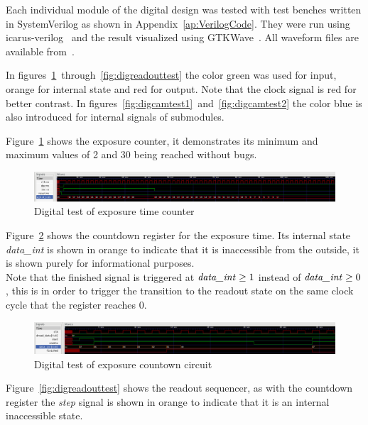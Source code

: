Each individual module of the digital design was tested with test benches written in SystemVerilog as shown in Appendix~\ref{ap:VerilogCode}.
They were run using icarus-verilog~\cite{icarusVL} and the result visualized using GTKWave~\cite{gtkwave}.
All waveform files are available from~\cite{githubProject}.

In figures~\ref{fig:digexptest}~through~\ref{fig:digreadouttest} the color green was used for input, orange for internal state and red for output.
Note that the clock signal is red for better contrast.
In figures~\ref{fig:digcamtest1}~and~\ref{fig:digcamtest2} the color blue is also introduced for internal signals of submodules.

Figure~\ref{fig:digexptest} shows the exposure counter, it demonstrates its minimum and maximum values of 2 and 30 being reached without bugs.

\begin{figure}[H]
  \centering
  \includegraphics[width=\textwidth]{figures/expTest}
  \caption{Digital test of exposure time counter}
  \label{fig:digexptest}
\end{figure}

Figure~\ref{fig:digfcdtest} shows the countdown register for the exposure time. Its internal state \textit{data\_int} is shown in orange
to indicate that it is inaccessible from the outside, it is shown purely for informational purposes.\\
Note that the finished signal is triggered at $\text{\textit{data\_int}} \geq 1$ instead of $\text{\textit{data\_int}} \geq 0$,
this is in order to trigger the transition to the readout state on the same clock cycle that the register reaches 0.

\begin{figure}[H]
  \centering
  \includegraphics[width=\textwidth]{figures/fcdTest}
  \caption{Digital test of exposure countown circuit}
  \label{fig:digfcdtest}
\end{figure}

Figure~\ref{fig:digreadouttest} shows the readout sequencer, as with the countdown register the \textit{step} signal is shown in orange to indicate
that it is an internal inaccessible state.

